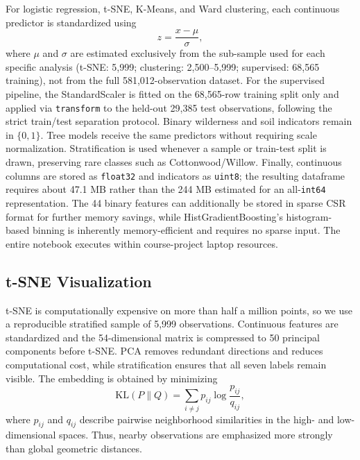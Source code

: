 \documentclass{article}
\begin{document}
For logistic regression, t-SNE, K-Means, and Ward clustering, each continuous predictor is standardized using
\begin{equation}
z=\frac{x-\mu}{\sigma},
\label{eq:standardization}
\end{equation}
where $\mu$ and $\sigma$ are estimated exclusively from the sub-sample used for each specific analysis (t-SNE: 5,999; clustering: 2,500--5,999; supervised: 68,565 training), not from the full 581,012-observation dataset. For the supervised pipeline, the StandardScaler is fitted on the 68,565-row training split only and applied via \texttt{transform} to the held-out 29,385 test observations, following the strict train/test separation protocol. Binary wilderness and soil indicators remain in $\{0,1\}$. Tree models receive the same predictors without requiring scale normalization. Stratification is used whenever a sample or train-test split is drawn, preserving rare classes such as Cottonwood/Willow. Finally, continuous columns are stored as \texttt{float32} and indicators as \texttt{uint8}; the resulting dataframe requires about 47.1 MB rather than the 244 MB estimated for an all-\texttt{int64} representation. The 44 binary features can additionally be stored in sparse CSR format for further memory savings, while HistGradientBoosting's histogram-based binning is inherently memory-efficient and requires no sparse input. The entire notebook executes within course-project laptop resources.

\subsection{t-SNE Visualization}

t-SNE \cite{tsne} is computationally expensive on more than half a million points, so we use a reproducible stratified sample of 5,999 observations. Continuous features are standardized and the 54-dimensional matrix is compressed to 50 principal components before t-SNE. PCA removes redundant directions and reduces computational cost, while stratification ensures that all seven labels remain visible. The embedding is obtained by minimizing
\begin{equation}
\text{KL}(P\|Q)=\sum_{i\neq j}p_{ij}\log\frac{p_{ij}}{q_{ij}},
\label{eq:tsne}
\end{equation}
where $p_{ij}$ and $q_{ij}$ describe pairwise neighborhood similarities in the high- and low-dimensional spaces. Thus, nearby observations are emphasized more strongly than global geometric distances.
\end{document}
